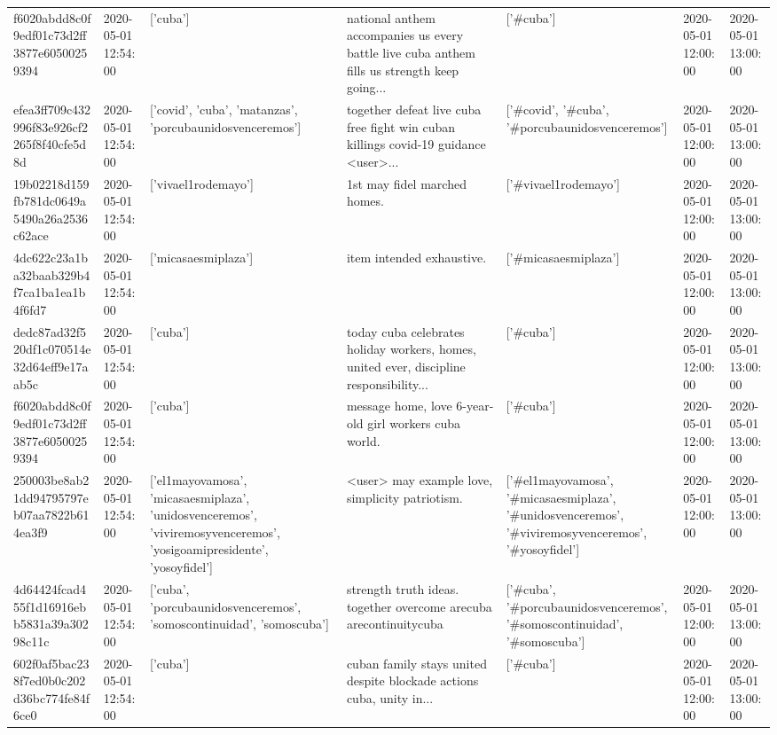 \begin{tabular}{lllllll}
f6020abdd8c0f9edf01c73d2ff3877e60500259394 & 2020-05-01 12:54:00 & ['cuba'] & national anthem accompanies us every battle live cuba anthem fills us strength keep going... & ['#cuba'] & 2020-05-01 12:00:00 & 2020-05-01 13:00:00 \\
efea3ff709c432996f83e926cf2265f8f40cfe5d8d & 2020-05-01 12:54:00 & ['covid', 'cuba', 'matanzas', 'porcubaunidosvenceremos'] & together defeat live cuba free fight win cuban killings covid-19 guidance <user>... & ['#covid', '#cuba', '#porcubaunidosvenceremos'] & 2020-05-01 12:00:00 & 2020-05-01 13:00:00 \\
19b02218d159fb781dc0649a5490a26a2536c62ace & 2020-05-01 12:54:00 & ['vivael1rodemayo'] & 1st may fidel marched homes. & ['#vivael1rodemayo'] & 2020-05-01 12:00:00 & 2020-05-01 13:00:00 \\
4dc622c23a1ba32baab329b4f7ca1ba1ea1b4f6fd7 & 2020-05-01 12:54:00 & ['micasaesmiplaza'] & item intended exhaustive. & ['#micasaesmiplaza'] & 2020-05-01 12:00:00 & 2020-05-01 13:00:00 \\
dedc87ad32f520df1c070514e32d64eff9e17aab5c & 2020-05-01 12:54:00 & ['cuba'] & today cuba celebrates holiday workers, homes, united ever, discipline responsibility... & ['#cuba'] & 2020-05-01 12:00:00 & 2020-05-01 13:00:00 \\
f6020abdd8c0f9edf01c73d2ff3877e60500259394 & 2020-05-01 12:54:00 & ['cuba'] & message home, love 6-year-old girl workers cuba world. & ['#cuba'] & 2020-05-01 12:00:00 & 2020-05-01 13:00:00 \\
250003be8ab21dd94795797eb07aa7822b614ea3f9 & 2020-05-01 12:54:00 & ['el1mayovamosa', 'micasaesmiplaza', 'unidosvenceremos', 'viviremosyvenceremos', 'yosigoamipresidente', 'yosoyfidel'] & <user> may example love, simplicity patriotism. & ['#el1mayovamosa', '#micasaesmiplaza', '#unidosvenceremos', '#viviremosyvenceremos', '#yosoyfidel'] & 2020-05-01 12:00:00 & 2020-05-01 13:00:00 \\
4d64424fcad455f1d16916ebb5831a39a30298c11c & 2020-05-01 12:54:00 & ['cuba', 'porcubaunidosvenceremos', 'somoscontinuidad', 'somoscuba'] & strength truth ideas. together overcome arecuba arecontinuitycuba & ['#cuba', '#porcubaunidosvenceremos', '#somoscontinuidad', '#somoscuba'] & 2020-05-01 12:00:00 & 2020-05-01 13:00:00 \\
602f0af5bac238f7ed0b0c202d36bc774fe84f6ce0 & 2020-05-01 12:54:00 & ['cuba'] & cuban family stays united despite blockade actions cuba, unity in... & ['#cuba'] & 2020-05-01 12:00:00 & 2020-05-01 13:00:00 \\

\end{tabular}
